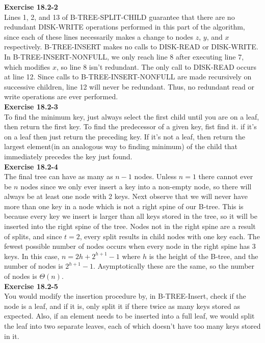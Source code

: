 \documentclass{article}
\begin{document}
\noindent\textbf{Exercise 18.2-2}\\

Lines 1, 2, and 13 of B-TREE-SPLIT-CHILD guarantee that there are no redundant DISK-WRITE operations performed in this part of the algorithm, since each of these lines necessarily makes a change to nodes $z$, $y$, and $x$ respectively.  B-TREE-INSERT makes no calls to DISK-READ or DISK-WRITE.  In B-TREE-INSERT-NONFULL, we only reach line 8 after executing line 7, which modifies $x$, so line 8 isn't redundant.  The only call to DISK-READ occurs at line 12.  Since calls to B-TREE-INSERT-NONFULL are made recursively on successive children, line 12 will never be redundant.  Thus, no redundant read or write operations are ever performed.\\

\noindent\textbf{Exercise 18.2-3}\\

To find the minimum key, just always select the first child until you are on a leaf, then return the first key. To find the predecessor of a given key, fist find it. if it's on a leaf then just return the preceding key. If it's not a leaf, then return the largest element(in an analogous way to finding minimum) of the child that immediately precedes the key just found.\\ 

\noindent\textbf{Exercise 18.2-4}\\

The final tree can have as many as $n-1$ nodes. Unless $n=1$ there cannot ever be $n$ nodes since we only ever insert a key into a non-empty node, so there will always be at least one node with 2 keys.  Next observe that we will never have more than one key in a node which is not a right spine of our B-tree.  This is because every key we insert is larger than all keys stored in the tree, so it will be inserted into the right spine of the tree.  Nodes not in the right spine are a result of splits, and since $t=2$, every split results in child nodes with one key each. The fewest possible number of nodes occurs when every node in the right spine has 3 keys.  In this case, $n=2h + 2^{h+1}-1$ where $h$ is the height of the B-tree, and the number of nodes is $2^{h+1}-1$.  Asymptotically these are the same, so the number of nodes is $\Theta(n)$.\\

\noindent\textbf{Exercise 18.2-5}\\

You would modify the insertion procedure by, in B-TREE-Insert, check if the node is a leaf, and if it is, only split it if there twice as many keys stored as expected. Also, if an element needs to be inserted into a full leaf, we would split the leaf into two separate leaves, each of which doesn't have too many keys stored in it.\\
\end{document}
